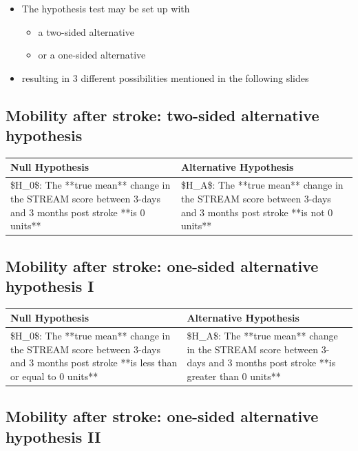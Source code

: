 \documentclass[
]{book}
\providecommand{\tightlist}{%
  \setlength{\itemsep}{0pt}\setlength{\parskip}{0pt}}
\begin{document}
\begin{itemize}
\tightlist
\item
  The hypothesis test may be set up with

  \begin{itemize}
  \tightlist
  \item
    a two-sided alternative
  \item
    or a one-sided alternative
  \end{itemize}
\item
  resulting in 3 different possibilities mentioned in
  the following slides
\end{itemize}

\hypertarget{mobility-after-stroke-two-sided-alternative-hypothesis}{%
\subsection{Mobility after stroke: two-sided alternative hypothesis}\label{mobility-after-stroke-two-sided-alternative-hypothesis}}

\begin{tabular}{l|l}
\hline
Null Hypothesis & Alternative Hypothesis\\
\hline
\$H\_0\$: The **true mean** change in the STREAM score between 3-days and 3 months post stroke **is 0 units** & \$H\_A\$: The **true mean** change in the STREAM score between 3-days and 3 months post stroke **is not 0 units**\\
\hline
\end{tabular}

\hypertarget{mobility-after-stroke-one-sided-alternative-hypothesis-i}{%
\subsection{Mobility after stroke: one-sided alternative hypothesis I}\label{mobility-after-stroke-one-sided-alternative-hypothesis-i}}

\begin{tabular}{l|l}
\hline
Null Hypothesis & Alternative Hypothesis\\
\hline
\$H\_0\$: The **true mean** change in the STREAM score between 3-days and 3 months post stroke **is less than or equal to 0 units** & \$H\_A\$: The **true mean** change in the STREAM score between 3-days and 3 months post stroke **is greater than 0 units**\\
\hline
\end{tabular}

\hypertarget{mobility-after-stroke-one-sided-alternative-hypothesis-ii}{%
\subsection{Mobility after stroke: one-sided alternative hypothesis II}\label{mobility-after-stroke-one-sided-alternative-hypothesis-ii}}
\end{document}
